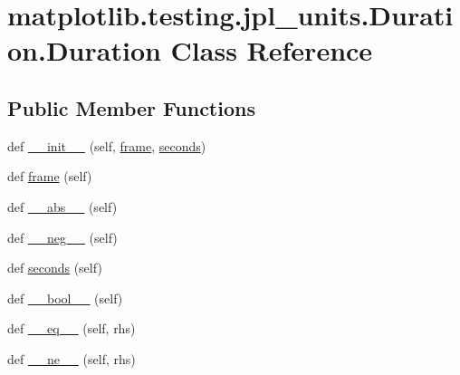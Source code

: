 \hypertarget{classmatplotlib_1_1testing_1_1jpl__units_1_1Duration_1_1Duration}{}\section{matplotlib.\+testing.\+jpl\+\_\+units.\+Duration.\+Duration Class Reference}
\label{classmatplotlib_1_1testing_1_1jpl__units_1_1Duration_1_1Duration}
\subsection*{Public Member Functions}
\begin{DoxyCompactItemize}
\item 
def \hyperlink{classmatplotlib_1_1testing_1_1jpl__units_1_1Duration_1_1Duration_abdb2d83fd380171c27d1edb063d081ea}{\+\_\+\+\_\+init\+\_\+\+\_\+} (self, \hyperlink{classmatplotlib_1_1testing_1_1jpl__units_1_1Duration_1_1Duration_a9d8a16f1df93e65c14ef24979b9d5655}{frame}, \hyperlink{classmatplotlib_1_1testing_1_1jpl__units_1_1Duration_1_1Duration_a2570f488a31395e333bf4910becab7b1}{seconds})
\item 
def \hyperlink{classmatplotlib_1_1testing_1_1jpl__units_1_1Duration_1_1Duration_a9d8a16f1df93e65c14ef24979b9d5655}{frame} (self)
\item 
def \hyperlink{classmatplotlib_1_1testing_1_1jpl__units_1_1Duration_1_1Duration_ab9da72a07cd5667952ef8ae2296fd7b1}{\+\_\+\+\_\+abs\+\_\+\+\_\+} (self)
\item 
def \hyperlink{classmatplotlib_1_1testing_1_1jpl__units_1_1Duration_1_1Duration_a8635c8b9c7534b82e097354451389827}{\+\_\+\+\_\+neg\+\_\+\+\_\+} (self)
\item 
def \hyperlink{classmatplotlib_1_1testing_1_1jpl__units_1_1Duration_1_1Duration_a2570f488a31395e333bf4910becab7b1}{seconds} (self)
\item 
def \hyperlink{classmatplotlib_1_1testing_1_1jpl__units_1_1Duration_1_1Duration_a4e84560549073b5de9bbec6925afeec9}{\+\_\+\+\_\+bool\+\_\+\+\_\+} (self)
\item 
def \hyperlink{classmatplotlib_1_1testing_1_1jpl__units_1_1Duration_1_1Duration_a83ded8268e20cf4e2c8572919f51f098}{\+\_\+\+\_\+eq\+\_\+\+\_\+} (self, rhs)
\item 
def \hyperlink{classmatplotlib_1_1testing_1_1jpl__units_1_1Duration_1_1Duration_a9a7bebaf9c9a0eb44d4097da978ed3c3}{\+\_\+\+\_\+ne\+\_\+\+\_\+} (self, rhs)
\item 

\end{DoxyCompactItemize}

